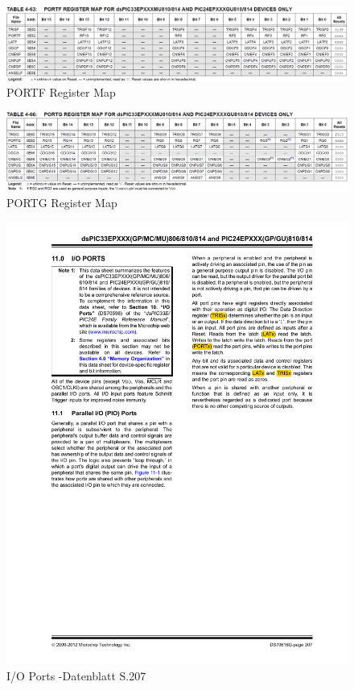 \begin{figure}[h]
	\centering
	\includegraphics[width=\textwidth]{Images/PORTF}
	\caption[PORTF Register Map]{PORTF Register Map}
	\label{image:PORTF}
\end{figure}

\begin{figure}[h]
	\centering
	\includegraphics[width=\textwidth]{Images/PORTG}
	\caption[PORTG Register Map]{PORTG Register Map}
	\label{image:PORTG}
\end{figure}

\begin{figure}[h]
	\centering
	\includegraphics[width=\textwidth]{Images/page207}
	\caption[I/O Ports]{I/O Ports -Datenblatt S.207}
	\label{image:page207}
\end{figure}


